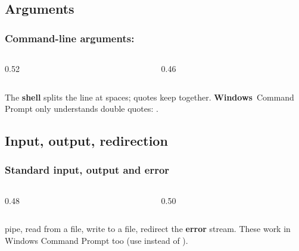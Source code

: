 \documentclass[aspectratio=169,10pt,compress]{beamer}
\newcommand{\win}{\textbf{Windows}}
\begin{document}
\subsection[Arguments]{Arguments}




\begin{frame}[t,fragile] \frametitle{Command-line arguments: }
  \begin{columns}[T]
    \begin{column}{0.52\textwidth}
    \end{column}
    \begin{column}{0.46\textwidth}
    \end{column}
  \end{columns}

  \vspace{0.1em}
  \small The \textbf{shell} splits the line at spaces; quotes keep  together. \win\ Command Prompt
  only understands double quotes: .
\end{frame}

\subsection[Streams]{Input, output, redirection}




\begin{frame}[t,fragile] \frametitle{Standard input, output and error}
  \begin{columns}[T]
    \begin{column}{0.48\textwidth}
    \end{column}
    \begin{column}{0.50\textwidth}
    \end{column}
  \end{columns}

  \vspace{0.1em}
  \small \hCode{|} pipe, \hCode{<} read from a file, \hCode{>} write to a file,  redirect the \textbf{error} stream.
  These work in Windows Command Prompt too (use  instead of ).
\end{frame}
\end{document}
